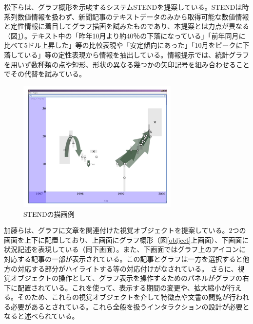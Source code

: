 \documentclass{matsushita-zemi}
\begin{document}
松下らは、グラフ概形を示唆するシステムSTENDを提案している\cite{STEND}。STENDは時系列数値情報を扱わず、新聞記事のテキストデータのみから取得可能な数値情報と定性情報に着目してグラフ描画を試みたものであり、本提案とは力点が異なる（図\ref{STEND}）。テキスト中の「昨年10月より約40％の下落になっている」「前年同月に比べて5ドル上昇した」等の比較表現や「安定傾向にあった」「10月をピークに下落している」等の定性表現から情報を抽出している。情報提示では、統計グラフを用いず数種類の点や短形、形状の異なる幾つかの矢印記号を組み合わせることでその代替を試みている。
\begin{figure}[tb]
  \begin{center}
   \includegraphics[width=8cm,bb=0 0 512 422]{STEND.PNG}
  \end{center}
 \caption{STENDの描画例}
 \label{STEND}
\end{figure}
加藤らは、グラフに文章を関連付けた視覚オブジェクトを提案している\cite{InformationcompiledStudyGroup}。2つの画面を上下に配置しており、上画面にグラフ概形（図\ref{oblject}上画面）、下画面に状況記述を表現している（同下画面）。また、下画面ではグラフ上のアイコンに対応する記事の一部が表示されている。この記事とグラフは一方を選択すると他方の対応する部分がハイライトする等の対応付けがなされている。
さらに、視覚オブジェクトの操作として、グラフ表示を操作するためのパネルがグラフの右下に配置されている。これを使って、表示する期間の変更や、拡大縮小が行える。そのため、これらの視覚オブジェクトを介して特徴点や文書の閲覧が行われる必要があるとされている。これら全般を扱うインタラクションの設計が必要となると述べられている。
\end{document}
